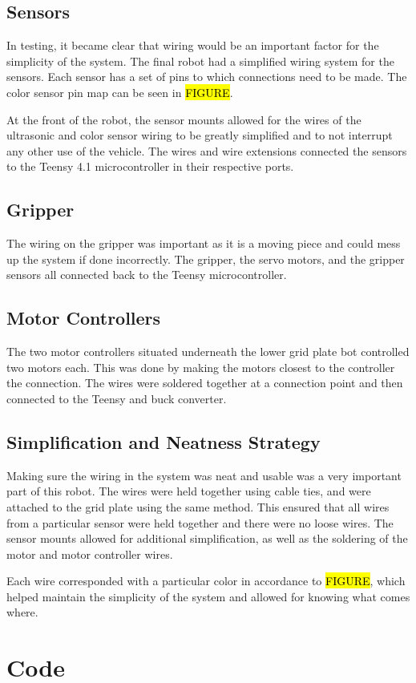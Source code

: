 \documentclass[11pt]{report}
\begin{document}
\subsection{Sensors}
In testing, it became clear that wiring would be an important factor for the simplicity of the system. The final robot had a simplified wiring system for the sensors. Each sensor has a set of pins to which connections need to be made. The color sensor pin map can be seen in \hl{FIGURE}. 
\par At the front of the robot, the sensor mounts allowed for the wires of the ultrasonic and color sensor wiring to be greatly simplified and to not interrupt any other use of the vehicle. The wires and wire extensions connected the sensors to the Teensy 4.1 microcontroller in their respective ports.
\subsection{Gripper}
The wiring on the gripper was important as it is a moving piece and could mess up the system if done incorrectly. The gripper, the servo motors, and the gripper sensors all connected back to the Teensy microcontroller. 
\subsection{Motor Controllers}
The two motor controllers situated underneath the lower grid plate bot controlled two motors each. This was done by making the motors closest to the controller the connection. The wires were soldered together at a connection point and then connected to the Teensy and buck converter. 
\subsection{Simplification and Neatness Strategy}
Making sure the wiring in the system was neat and usable was a very important part of this robot. The wires were held together using cable ties, and were attached to the grid plate using the same method. This ensured that all wires from a particular sensor were held together and there were no loose wires. The sensor mounts allowed for additional simplification, as well as the soldering of the motor and motor controller wires. 
\par Each wire corresponded with a particular color in accordance to \hl{FIGURE}, which helped maintain the simplicity of the system and allowed for knowing what comes where. 
\section{Code}
\end{document}
